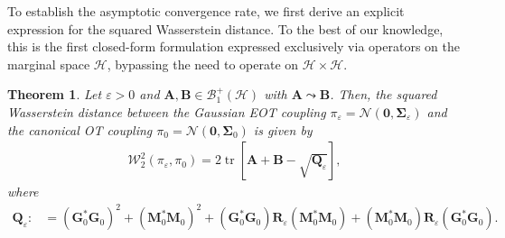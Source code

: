 \documentclass[noinfoline]{imsart}\setcounter{tocdepth}{2}
\newcommand{\m}[1]{\mathbf{#1}}
\renewcommand{\c}[1]{\mathcal{#1}}
\DeclareMathOperator{\tr}{tr}
\theoremstyle{plain}
\newtheorem{theorem}{Theorem}[section]
\begin{document}
To establish the asymptotic convergence rate, we first derive an explicit expression for the squared Wasserstein distance. To the best of our knowledge, this is the first closed-form formulation expressed exclusively via operators on the marginal space $\c{H}$, bypassing the need to operate on $\c{H} \times \c{H}$.

\begin{theorem}\label{thm:W2:exact}
Let $\varepsilon > 0$ and $\m{A}, \m{B} \in \c{B}_{1}^{+}(\c{H})$ with $\m{A} \leadsto \m{B}$. Then, the squared Wasserstein distance between the Gaussian EOT coupling $\pi_{\varepsilon} = \c{N}(\m{0}, \m{\Sigma}_{\varepsilon})$ and the canonical OT coupling $\pi_{0} = \c{N}(\m{0}, \m{\Sigma}_{0})$ is given by
\begin{align*}
    \c{W}_{2}^{2}(\pi_{\varepsilon}, \pi_{0}) = 2 \tr [\m{A} + \m{B}- \sqrt{\m{Q}_{\varepsilon}}],
\end{align*}
where
\begin{align*}
    \m{Q}_{\varepsilon} :&= (\m{G}_{0}^{*} \m{G}_{0})^{2} + (\m{M}_{0}^{*} \m{M}_{0})^{2} + (\m{G}_{0}^{*} \m{G}_{0}) \m{R}_{\varepsilon} (\m{M}_{0}^{*} \m{M}_{0}) + (\m{M}_{0}^{*} \m{M}_{0}) \m{R}_{\varepsilon} (\m{G}_{0}^{*} \m{G}_{0}). 
\end{align*}
\end{theorem}
\end{document}
